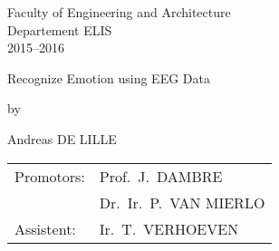 

\begin{titlepage}

\setlength{\hoffset}{-1in}
\setlength{\voffset}{-1in}
\setlength{\topmargin}{1.5cm}
\setlength{\headheight}{0.5cm}
\setlength{\headsep}{1cm}
\setlength{\oddsidemargin}{3cm}
\setlength{\evensidemargin}{3cm}
\setlength{\footskip}{1.5cm}
\enlargethispage{1cm}


\fontsize{12pt}{14pt}
\selectfont

\begin{center}


\vspace{0.5cm}

Faculty of Engineering and Architecture\\
Departement ELIS\\
2015--2016 \\

\vspace{3.5cm}

\fontsize{17.28pt}{21pt}
\selectfont

Recognize Emotion using EEG Data

\fontsize{12pt}{14pt}
\selectfont

\vspace{.6cm}

by 

\vspace{.4cm}

Andreas DE LILLE

\vspace{3.5cm}


\begin{tabular}{ll}
Promotors: & Prof.~J.~DAMBRE\\
 & Dr.~Ir.~P.~VAN MIERLO\\
Assistent: & Ir.~T.~VERHOEVEN\\
\end{tabular}
 

\vspace{3cm}


\end{center}
\end{titlepage}
